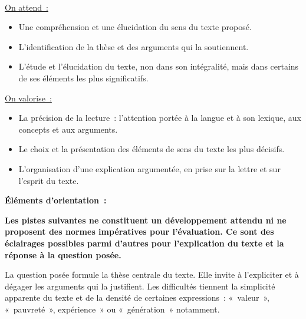 \vfill{~}\clearpage

{\underline{On attend~:}
\begin{itemize}
\item Une compréhension et une élucidation du sens du texte proposé.
\item L'identification de la thèse et des arguments qui la soutiennent.
\item L'étude et l'élucidation du texte, non dans son intégralité, mais dans certains de ses
éléments les plus significatifs.
\end{itemize}
\underline{On valorise~:}
\begin{itemize}
\item La précision de la lecture~: l'attention portée à la langue et à son lexique, aux concepts et
aux arguments.
\item Le choix et la présentation des éléments de sens du texte les plus décisifs.
\item L'organisation d'une explication argumentée, en prise sur la lettre et sur l'esprit du texte.
\end{itemize}

\bigskip

\textbf{Éléments d'orientation~:}

\textbf{Les pistes suivantes ne constituent un développement attendu ni ne proposent des
normes impératives pour l'évaluation. Ce sont des éclairages possibles parmi d'autres
pour l'explication du texte et la réponse à la question posée.}

La question posée formule la thèse centrale du texte. Elle invite à l'expliciter et à dégager
les arguments qui la justifient. Les difficultés tiennent la simplicité apparente du texte et de la
densité de certaines expressions~: «~valeur~», «~pauvreté~», expérience~» ou «~génération~»
notamment.

}
